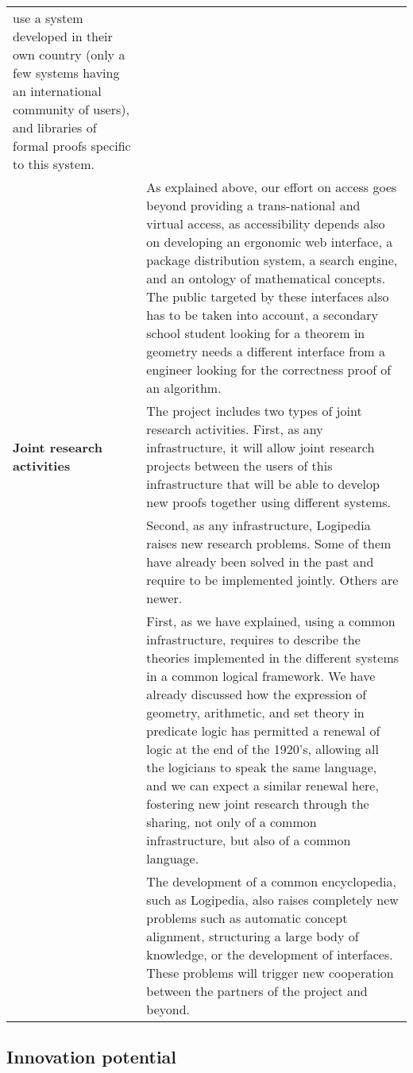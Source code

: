 \begin{longtable}{|p{}|p{}|}
use a system developed in their own country (only a few systems having
an international community of users), and libraries of formal proofs
specific to this system.\\
&
\hspace{0.4cm}
As explained above, our effort on access goes beyond providing a
trans-national and virtual access, as accessibility depends also on
developing an ergonomic web interface, a package distribution system,
a search engine, and an ontology of mathematical concepts. The public
targeted by these interfaces also has to be taken into account, a
secondary school student looking for a theorem in geometry needs a
different interface from a engineer looking for the correctness proof
of an algorithm.\\
\hline
{\bf Joint research activities}
&
The project includes two types of joint research activities.  First,
as any infrastructure, it will allow joint research projects between
the users of this infrastructure that will be able to develop new
proofs together using different systems.\\
&
\hspace{0.4cm}
Second, as any infrastructure, Logipedia raises new research
problems. Some of them have already been solved in the past and
require to be implemented jointly. Others are newer.\\
&
\hspace{0.4cm}
First, as we have explained, using a common infrastructure, requires
to describe the theories implemented in the different systems in a
common logical framework. We have already discussed how the expression
of geometry, arithmetic, and set theory in predicate logic has
permitted a renewal of logic at the end of the 1920's, allowing all
the logicians to speak the same language, and we can expect a similar
renewal here, fostering new joint research through the sharing, not
only of a common infrastructure, but also of a common language.\\
&
\hspace{0.4cm}
The development of a common encyclopedia, such as Logipedia, also
raises completely new problems such as automatic concept alignment,
structuring a large body of knowledge, or the development of
interfaces. These problems will trigger new cooperation between the
partners of the project and beyond.\\
\hline
\end{longtable}

\subsection*{Innovation potential}

